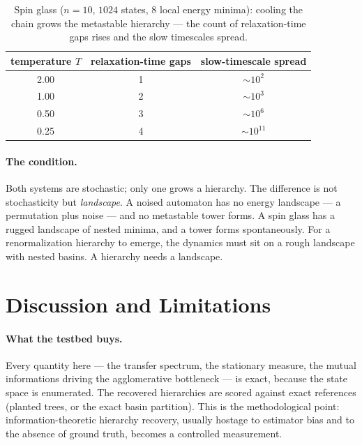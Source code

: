 \documentclass[11pt]{article}
\begin{document}
\begin{table}[h]
\centering
\caption{Spin glass ($n{=}10$, $1024$ states, $8$ local energy minima): cooling
the chain grows the metastable hierarchy --- the count of relaxation-time gaps
rises and the slow timescales spread.}
\label{tab:glass}
\begin{tabular}{ccc}
\toprule
temperature $T$ & relaxation-time gaps & slow-timescale spread \\
\midrule
2.00 & 1 & ${\sim}10^{2}$ \\
1.00 & 2 & ${\sim}10^{3}$ \\
0.50 & 3 & ${\sim}10^{6}$ \\
0.25 & 4 & ${\sim}10^{11}$ \\
\bottomrule
\end{tabular}
\end{table}

\paragraph{The condition.}
Both systems are stochastic; only one grows a hierarchy. The difference is not
stochasticity but \emph{landscape}. A noised automaton has no energy landscape
--- a permutation plus noise --- and no metastable tower forms. A spin glass has
a rugged landscape of nested minima, and a tower forms spontaneously. For a
renormalization hierarchy to emerge, the dynamics must sit on a rough landscape
with nested basins. A hierarchy needs a landscape.

\section{Discussion and Limitations}
\label{sec:discussion}

\paragraph{What the testbed buys.}
Every quantity here --- the transfer spectrum, the stationary measure, the
mutual informations driving the agglomerative bottleneck --- is exact, because
the state space is enumerated. The recovered hierarchies are scored against
exact references (planted trees, or the exact basin partition). This is the
methodological point: information-theoretic hierarchy recovery, usually
hostage to estimator bias and to the absence of ground truth, becomes a
controlled measurement.
\end{document}

